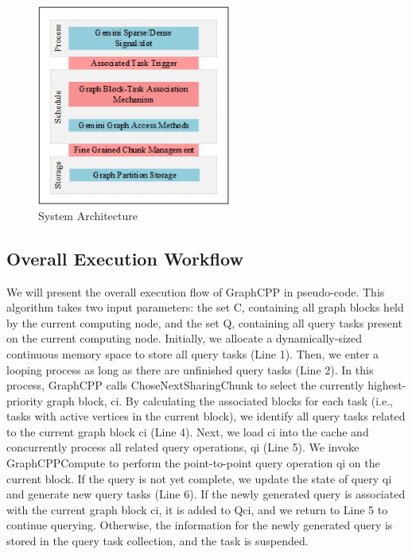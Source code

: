 \documentclass[lettersize,journal]{IEEEtran} %
\begin{document}
\begin{figure}[!t]
\centering
\includegraphics[width=2.5in]{viso插图}
\caption{System Architecture}  
\label{viso插图}
\end{figure}
 
\subsection{Overall Execution Workflow}
We will present the overall execution flow of GraphCPP in pseudo-code. This algorithm takes two input parameters: the set C, containing all graph blocks held by the current computing node, and the set Q, containing all query tasks present on the current computing node. Initially, we allocate a dynamically-sized continuous memory space to store all query tasks (Line 1). Then, we enter a looping process as long as there are unfinished query tasks (Line 2). In this process, GraphCPP calls ChoseNextSharingChunk to select the currently highest-priority graph block, ci. By calculating the associated blocks for each task (i.e., tasks with active vertices in the current block), we identify all query tasks related to the current graph block ci (Line 4). Next, we load ci into the cache and concurrently process all related query operations, qi (Line 5). We invoke GraphCPPCompute to perform the point-to-point query operation qi on the current block. If the query is not yet complete, we update the state of query qi and generate new query tasks (Line 6). If the newly generated query is associated with the current graph block ci, it is added to Qci, and we return to Line 5 to continue querying. Otherwise, the information for the newly generated query is stored in the query task collection, and the task is suspended.
\end{document}
